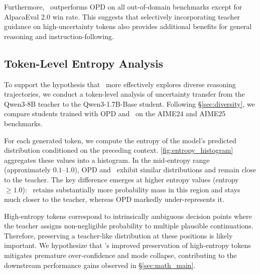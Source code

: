 Furthermore, \method~outperforms OPD on all out-of-domain benchmarks except for AlpacaEval 2.0 win rate. This suggests that selectively incorporating teacher guidance on high-uncertainty tokens also provides additional benefits for general reasoning and instruction-following.




\subsection{Token-Level Entropy Analysis}
\label{sec:token_level_entropy}
To support the hypothesis that \method~more effectively explores diverse reasoning trajectories, we conduct a token-level analysis of uncertainty transfer from the Qwen3-8B teacher to the Qwen3-1.7B-Base student. Following \S\ref{sec:diversity}, we compare students trained with OPD and \method~on the AIME24 and AIME25 benchmarks.

For each generated token, we compute the entropy of the model's predicted distribution conditioned on the preceding context. \autoref{fig:entropy_histogram} aggregates these values into a histogram. In the mid-entropy range (approximately $0.1$–$1.0$), OPD and \method~exhibit similar distributions and remain close to the teacher. The key difference emerges at higher entropy values (entropy $\ge 1.0$): \method~retains substantially more probability mass in this region and stays much closer to the teacher, whereas OPD markedly under-represents it.

High-entropy tokens correspond to intrinsically ambiguous decision points where the teacher assigns non-negligible probability to multiple plausible continuations. Therefore, preserving a teacher-like distribution at these positions is likely important. We hypothesize that \method’s improved preservation of high-entropy tokens mitigates premature over-confidence and mode collapse, contributing to the downstream performance gains observed in \S\ref{sec:math_main}.


